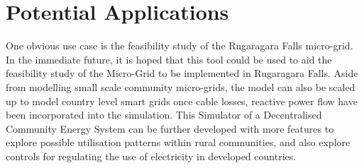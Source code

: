 \section*{Potential Applications}
One obvious use case is the feasibility study of the Rugaragara Falls micro-grid. In the immediate future, it is hoped that this tool could be used to aid the feasibility study of the Micro-Grid to be implemented in Rugaragara Falls. Aside from modelling small scale community micro-grids, the model can also be scaled up to model country level smart grids once cable losses, reactive power flow have been incorporated into the simulation. 
This Simulator of a Decentralised Community Energy System can be further developed with more features to explore possible utilisation patterns within rural communities, and also explore controls for regulating the use of electricity in developed countries. 